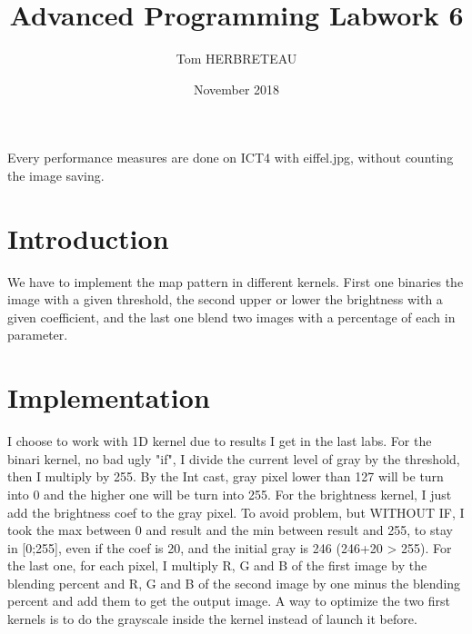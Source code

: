 \documentclass{article}
\title{Advanced Programming Labwork 6}
\author{Tom HERBRETEAU }
\date{November 2018}
\begin{document}
\maketitle
Every performance measures are done on ICT4 with eiffel.jpg, without counting the image saving.
\section{Introduction}
We have to implement the map pattern in different kernels. First one binaries the image with a given threshold, the second upper or lower the brightness with a given coefficient, and the last one blend two images with a percentage of each in parameter.
\section{Implementation}
I choose to work with 1D kernel due to results I get in the last labs. For the binari kernel, no bad ugly "if", I divide the current level of gray by the threshold, then I multiply by 255. By the Int cast, gray pixel lower than 127 will be turn into 0 and the higher one will be turn into 255. For the brightness kernel, I just add the brightness coef to the gray pixel. To avoid problem, but WITHOUT IF, I took the max between 0 and result and the min between result and 255, to stay in [0;255], even if the coef is 20, and the initial gray is 246 (246+20 > 255). For the last one, for each pixel, I multiply R, G and B of the first image by the blending percent and R, G and B of the second image by one minus the blending percent and add them to get the output image.
\newline
A way to optimize the two first kernels is to do the grayscale inside the kernel instead of launch it before. 
\end{document}
